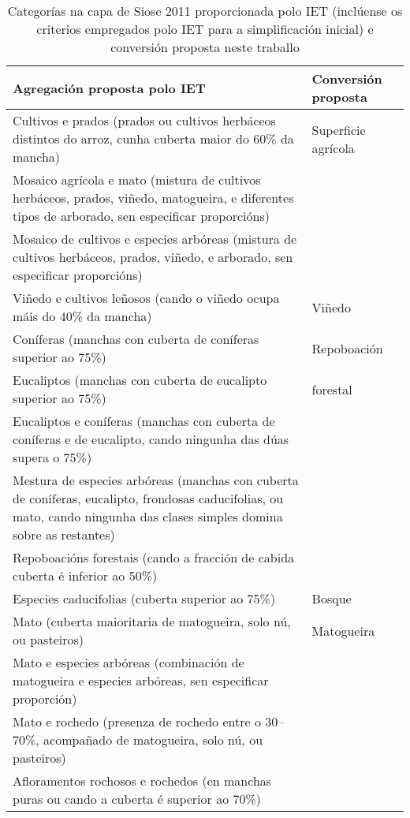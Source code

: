 \documentclass[11pt,a4paper]{article}
\begin{document}
\begin{table}
\caption{Categorías na capa de Siose 2011 proporcionada polo IET (inclúense os criterios empregados polo IET para a simplificación inicial) e conversión proposta neste traballo} \label{cadroSIOSE}
\begin{center}
\begin{small}
\begin{tabular}{p{}p{}}
\toprule
Agregación proposta polo IET & Conversión proposta\\
\midrule
Cultivos e prados (prados ou cultivos herbáceos distintos do arroz, cunha cuberta maior do 60\% da mancha) & Superficie agrícola \\
Mosaico agrícola e mato (mistura de cultivos herbáceos, prados, viñedo, matogueira, e diferentes tipos de arborado, sen especificar proporcións) &  \\
Mosaico de cultivos e especies arbóreas (mistura de cultivos herbáceos, prados, viñedo, e arborado, sen especificar proporcións) &  \\
\midrule
Viñedo e cultivos leñosos (cando o viñedo ocupa máis do 40\% da mancha) & Viñedo \\
\midrule
Coníferas (manchas con cuberta de coníferas superior ao 75\%) & Repoboación \\
Eucaliptos (manchas con cuberta de eucalipto superior ao 75\%) & forestal \\
Eucaliptos e coníferas (manchas con cuberta de coníferas e de eucalipto, cando ningunha das dúas supera o 75\%) &  \\
Mestura de especies arbóreas (manchas con cuberta de coníferas, eucalipto, frondosas caducifolias, ou mato, cando ningunha das clases simples domina sobre as restantes) & \\
Repoboacións forestais (cando a fracción de cabida cuberta é inferior ao 50\%) &  \\
\midrule
Especies caducifolias (cuberta superior ao 75\%) & Bosque \\
\midrule
Mato (cuberta maioritaria de matogueira, solo nú, ou pasteiros) & Matogueira\\
Mato e especies arbóreas (combinación de matogueira e especies arbóreas, sen especificar proporción) &  \\
Mato e rochedo (presenza de rochedo entre o 30--70\%, acompañado de matogueira, solo nú, ou pasteiros) &  \\
Afloramentos rochosos e rochedos (en manchas puras ou cando a cuberta é superior ao 70\%) &  \\

\end{tabular}
\end{small}
\end{center}
\end{table}
\end{document}
